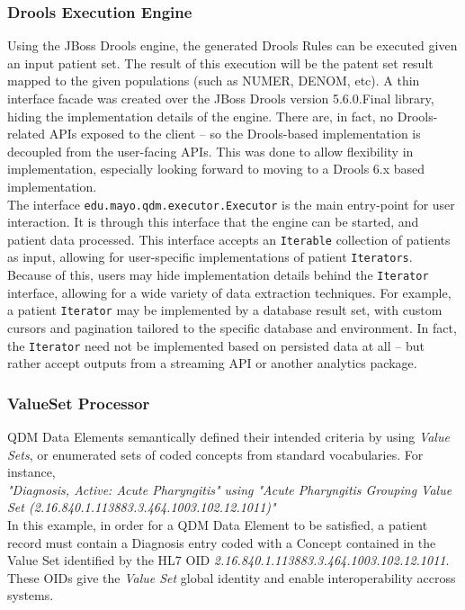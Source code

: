 \documentclass{amia}
\begin{document}
\subsubsection*{Drools Execution Engine}
Using the JBoss Drools engine, the generated Drools Rules can be executed given an input patient set. The result of this execution will be the patent set result mapped to the given populations (such as NUMER, DENOM, etc). A thin interface facade was created over the JBoss Drools version 5.6.0.Final library, hiding the implementation details of the engine. There are, in fact, no Drools-related APIs exposed to the client -- so the Drools-based implementation is decoupled from the user-facing APIs. This was done to allow flexibility in implementation, especially looking forward to moving to a Drools 6.x based implementation.\\
The interface \texttt{edu.mayo.qdm.executor.Executor} is the main entry-point for user interaction. It is through this interface that the engine can be started, and patient data processed. This interface accepts an \texttt{Iterable} collection of patients as input, allowing for user-specific implementations of patient \texttt{Iterators}. Because of this, users may hide implementation details behind the \texttt{Iterator} interface, allowing for a wide variety of data extraction techniques. For example, a patient \texttt{Iterator} may be implemented by a database result set, with custom cursors and pagination tailored to the specific database and environment. In fact, the \texttt{Iterator} need not be implemented based on persisted data at all -- but rather accept outputs from a streaming API or another analytics package.

\subsubsection*{ValueSet Processor}
QDM Data Elements semantically defined their intended criteria by using \textit{Value Sets}, or enumerated sets of coded concepts from standard vocabularies. For instance,\\

\textit{"Diagnosis, Active: Acute Pharyngitis" using "Acute Pharyngitis Grouping Value Set (2.16.840.1.113883.3.464.1003.102.12.1011)"}\\

In this example, in order for a QDM Data Element to be satisfied, a patient record must contain a Diagnosis entry coded with a Concept contained in the Value Set identified by the HL7 OID \textit{2.16.840.1.113883.3.464.1003.102.12.1011}. These OIDs give the \textit{Value Set} global identity and enable interoperability accross systems\cite{steindel2010oids}.
\end{document}
